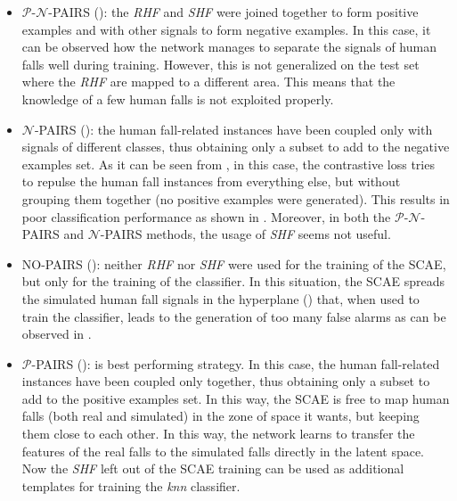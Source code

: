 \begin{itemize}
	\item $\mathcal{P}$-$\mathcal{N}$-PAIRS (): the \textit{RHF} and \textit{SHF} were joined together to form positive examples and with other signals to form negative examples. In this case, it can be observed how the network manages to separate the signals of human falls well during training. However, this is not generalized on the test set where the \textit{RHF} are mapped to a different area. This means that the knowledge of a few human falls is not exploited properly. 
	\item $\mathcal{N}$-PAIRS (): the human fall-related instances have been coupled only with signals of different classes, thus obtaining only a subset to add to the negative examples set. As it can be seen from , in this case, the contrastive loss tries to repulse the human fall instances from everything else, but without grouping them together (no positive examples were generated).
	This results in poor classification performance as shown in .
	Moreover, in both the $\mathcal{P}$-$\mathcal{N}$-PAIRS and $\mathcal{N}$-PAIRS methods, the usage of \textit{SHF} seems not useful.
	\item NO-PAIRS (): neither \textit{RHF} nor \textit{SHF} were used for the training of the SCAE, but only for the training of the classifier. In this situation, the SCAE spreads the simulated human fall signals in the hyperplane () that, when used to train the classifier, leads to the generation of too many false alarms as can be observed in . 
	\item $\mathcal{P}$-PAIRS (): is best performing strategy. In this case, the human fall-related instances have been coupled only together, thus obtaining only a subset to add to the positive examples set. In this way, the SCAE is free to map human falls (both real and simulated) in the zone of space it wants, but keeping them close to each other. In this way, the network learns to transfer the features of the real falls to the simulated falls directly in the latent space. Now the \textit{SHF} left out of the SCAE training can be used as additional templates for training the \textit{knn} classifier.
\end{itemize}
